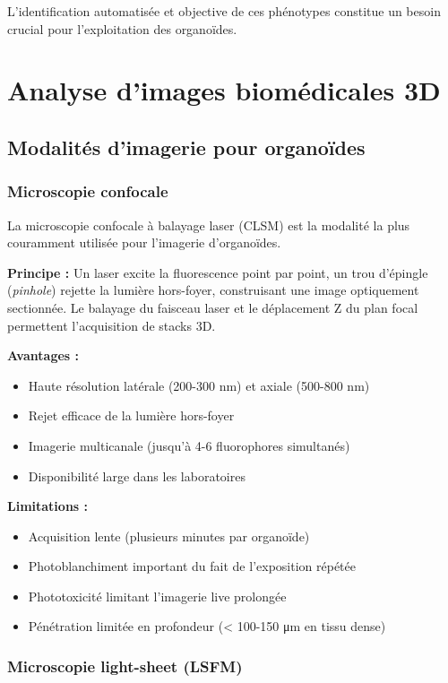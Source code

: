L'identification automatisée et objective de ces phénotypes constitue un besoin crucial pour l'exploitation des organoïdes.

\section{Analyse d'images biomédicales 3D}

\subsection{Modalités d'imagerie pour organoïdes}

\subsubsection{Microscopie confocale}

La microscopie confocale à balayage laser (CLSM) est la modalité la plus couramment utilisée pour l'imagerie d'organoïdes.

\textbf{Principe :}
Un laser excite la fluorescence point par point, un trou d'épingle (\textit{pinhole}) rejette la lumière hors-foyer, construisant une image optiquement sectionnée. Le balayage du faisceau laser et le déplacement Z du plan focal permettent l'acquisition de stacks 3D.

\textbf{Avantages :}
\begin{itemize}
    \item Haute résolution latérale (200-300 nm) et axiale (500-800 nm)
    \item Rejet efficace de la lumière hors-foyer
    \item Imagerie multicanale (jusqu'à 4-6 fluorophores simultanés)
    \item Disponibilité large dans les laboratoires
\end{itemize}

\textbf{Limitations :}
\begin{itemize}
    \item Acquisition lente (plusieurs minutes par organoïde)
    \item Photoblanchiment important du fait de l'exposition répétée
    \item Phototoxicité limitant l'imagerie live prolongée
    \item Pénétration limitée en profondeur (< 100-150 μm en tissu dense)
\end{itemize}

\subsubsection{Microscopie light-sheet (LSFM)}

